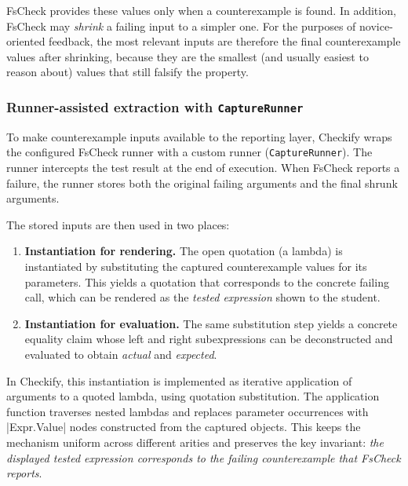 \skipM FsCheck provides these values only when a counterexample is found. In
addition, FsCheck may \emph{shrink} a failing input to a simpler one. For the
purposes of novice-oriented feedback, the most relevant inputs are therefore the
final counterexample values after shrinking, because they are the smallest (and
usually easiest to reason about) values that still falsify the property.

\subsubsection{Runner-assisted extraction with \texttt{CaptureRunner}} %
\label{sec:runner-assisted-extraction}

To make counterexample inputs available to the reporting layer, Checkify wraps
the configured FsCheck runner with a custom runner (\texttt{CaptureRunner}). The
runner intercepts the test result at the end of execution. When FsCheck reports a
failure, the runner stores both the original failing arguments and the final
shrunk arguments.

\skipM The stored inputs are then used in two places:

\begin{enumerate}
    \item \textbf{Instantiation for rendering.} The open quotation (a lambda) is
    instantiated by substituting the captured counterexample values for its
    parameters. This yields a quotation that corresponds to the concrete failing
    call, which can be rendered as the \emph{tested expression} shown to the
    student.

    \item \textbf{Instantiation for evaluation.} The same substitution step
    yields a concrete equality claim whose left and right subexpressions can be
    deconstructed and evaluated to obtain \emph{actual} and \emph{expected}.
\end{enumerate}

\skipM In Checkify, this instantiation is implemented as iterative application of
arguments to a quoted lambda, using quotation substitution. The application
function traverses nested lambdas and replaces parameter occurrences with
\fsharp|Expr.Value| nodes constructed from the captured objects. This keeps the
mechanism uniform across different arities and preserves the key invariant:
\emph{the displayed tested expression corresponds to the failing counterexample
that FsCheck reports}.

